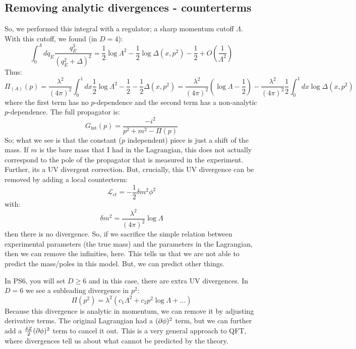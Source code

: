 \subsection{Removing analytic divergences - counterterms}
So, we performed this integral with a regulator; a sharp momentum cutoff $\Lambda$. With this cutoff, we found (in $D = 4$):
\begin{equation}
   \int_0^\Lambda dq_E \frac{q_E^{3}}{(q_E^2 + \Delta)^2} = \frac{1}{2}\log \Lambda^2 - \frac{1}{2}\log \Delta(x, p^2) - \frac{1}{2} + O(\frac{1}{\Lambda^2})
\end{equation}
Thus:
\begin{equation}
    \Pi_{(A)}(p) = \frac{\lambda^2}{(4\pi)^2}\int_0^1 dx \frac{1}{2}\log \Lambda^2 - \frac{1}{2} - \frac{1}{2}\Delta(x, p^2) = \frac{\lambda^2}{(4\pi)^2}(\log\Lambda - \frac{1}{2}) - \frac{\lambda^2}{(4\pi)^2}\frac{1}{2}\int_0^1 dx \log\Delta(x, p^2)
\end{equation}
where the first term has no $p$-dependence and the second term has a non-analytic $p$-dependence. The full propagator is:
\begin{equation}
    G_{\text{int}}(p) = \frac{-i^2}{p^2+ m^2 - \Pi(p)}
\end{equation}
So; what we see is that the constant ($p$ independent) piece is just a shift of the mass. If $m$ is the bare mass that I had in the Lagrangian, this does not actually correspond to the pole of the propagator that is measured in the experiment. Further, its a UV divergent correction. But, crucially, this UV divergence can be removed by adding a local counterterm:
\begin{equation}
    \mathcal{L}_{ct} = -\frac{1}{2}\delta m^2 \phi^2
\end{equation}
with:
\begin{equation}
    \delta m^2 = \frac{\lambda^2}{(4\pi)^2}\log \Lambda
\end{equation}
then there is no divergence. So, if we sacrifice the simple relation between experimental parameters (the true mass) and the parameters in the Lagrangian, then we can remove the infinities, here. This tells us that we are not able to predict the mass/poles in this model. But, we can predict other things.

In PS6, you will set $D \geq 6$ and in this case, there are extra UV divergences. In $D = 6$ we see a subleading divergence in $p^2$:
\begin{equation}
    \Pi(p^2) = \lambda^2(c_1\Lambda^2 + c_2p^2\log\Lambda + \ldots)
\end{equation}
Because this divergence is analytic in momentum, we can remove it by adjusting derivative terms. The original Lagrangian had a $(\partial\phi)^2$ term, but we can further add a $\frac{\delta Z}{2}(\partial \phi)^2$ term to cancel it out. This is a very general approach to QFT, where divergences tell us about what cannot be predicted by the theory.

